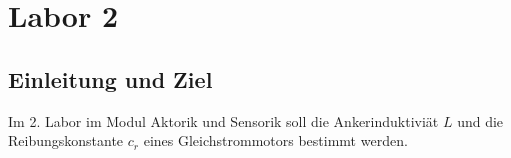 \section{Labor 2}

\subsection{Einleitung und Ziel}

Im 2. Labor im Modul Aktorik und Sensorik soll die Ankerinduktiviät $L$
und die Reibungskonstante $c_r$ eines Gleichstrommotors bestimmt werden.
